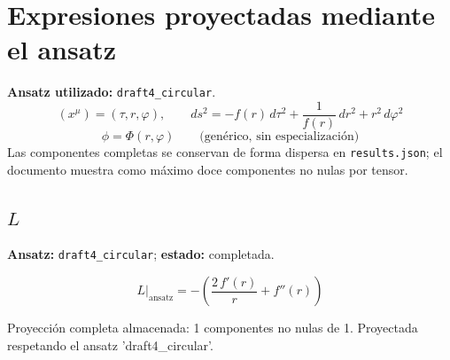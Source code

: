 \documentclass[11pt]{article}
\begin{document}
\section*{Expresiones proyectadas mediante el ansatz}
\textbf{Ansatz utilizado:} \texttt{draft4\_circular}.
\begin{dmath*}[breakdepth={3}]
(x^\mu)=\left(\tau, r, \varphi\right),\qquad ds^2 = -f\!\left(r\right)\,d\tau^2 + \frac{1}{f\!\left(r\right)}\,dr^2 + {r}^{2}\,d\varphi^2
\end{dmath*}
\begin{dmath*}[breakdepth={3}]
\phi = \Phi\!\left(r, \varphi\right)\qquad\text{(genérico, sin especialización)}
\end{dmath*}
Las componentes completas se conservan de forma dispersa en \texttt{results.json}; el documento muestra como máximo doce componentes no nulas por tensor.
\subsection*{$ L $}
\textbf{Ansatz:} \texttt{draft4\_circular}; \textbf{estado:} completada.\par
\begin{dmath*}[breakdepth={5}]
L\big|_{\mathrm{ansatz}} = -\left(\frac{2\,f'\!\left(r\right)}{r} + f''\!\left(r\right)\right)
\end{dmath*}
\par\smallskip
Proyección completa almacenada: 1 componentes no nulas de 1. Proyectada respetando el ansatz 'draft4\_circular'.\par\medskip
{}
\end{document}
